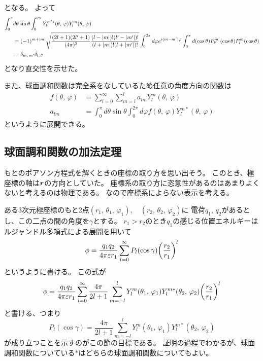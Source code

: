\documentclass[../master.tex]{subfiles}
\begin{document}
となる。
よって
\begin{equation}\begin{aligned}[b]
    \int_{0}^{\pi} &d\theta \sin\theta \int_{0}^{2\pi} Y_{l'}^{m'*}(\theta,\,\varphi) Y_l^m(\theta,\,\varphi)\\
	&= (-1)^{m+\abs{m}}\sqrt{\frac{(2l+1)(2l'+1)}{(4\pi)^2}\frac{(l-\abs{m})!(l'-\abs{m'})!}{(l+\abs{m})!(l+\abs{m'})!}}
	\int_{0}^{2\pi}d\varphi e^{i(m-m')\varphi} \int_{0}^{\pi} d(\cos\theta) P_{l'}^{m'}(\cos\theta)P_l^m(\cos\theta)\\
	&=\delta_{m,\,m'}\delta_{l,\,l'}
\end{aligned}\end{equation}
となり直交性を示せた。

また、球面調和関数は完全系をなしているため任意の角度方向の関数は
\begin{align}
	f(\theta,\,\varphi) &= \sum_{l=0}^{\infty}\sum_{m=l}^{l} a_{lm}Y_l^m(\theta,\,\varphi)\\
	a_{lm} &=\int_{0}^{\pi} d\theta\sin\theta\int_{0}^{2\pi}d\varphi f(\theta,\,\varphi)Y_l^{m*}(\theta,\,\varphi)
\end{align}
というように展開できる。

\subsection{球面調和関数の加法定理}
もとのポアソン方程式を解くときの座標の取り方を思い出そう。
このとき、極座標の軸は\(\vb*{r}\)の方向としていた。
座標系の取り方に恣意性があるのはあまりよくないと考えるのは物理である。
なので座標系によらない表示を考える。

ある3次元極座標のもと2点\((r_1,\,\theta_1,\,\varphi_1),\quad (r_2,\,\theta_2,\,\varphi_2)\)に
電荷\(q_1,\,q_2\)があるとし、この二点の間の角度を\(\gamma\)とする。
\(r_1>r_2\)のとき\(q_1\)の感じる位置エネルギーはルジャンドル多項式による展開を用いて
\begin{equation}
	\phi = \frac{q_1 q_2}{4\pi\varepsilon r_1} \sum_{l=0}^{\infty}P_l(\cos\gamma)\qty(\frac{r_2}{r_1})^l
\end{equation}
というように書ける。
この式が
\begin{equation}
	\phi = \frac{q_1 q_2}{4\pi\varepsilon r_1}
	\sum_{l=0}^{\infty}\frac{4\pi}{2l+1}\sum_{m=-l}^{l} Y_l^m(\theta_1,\,\varphi_1) Y_l^{m*}(\theta_2,\,\varphi_2)\qty(\frac{r_2}{r_1})^l
\end{equation}
と書ける、つまり
\begin{equation}
	P_l(\cos\gamma) = \frac{4\pi}{2l+1}\sum_{m=-l}^{l} Y_l^m(\theta_1,\,\varphi_1) Y_l^{m*}(\theta_2,\,\varphi_2)
\end{equation}
が成り立つことを示すのがこの節の目標である。
証明の過程でわかるが、球面調和関数についている\(*\)はどちらの球面調和関数についてもよい。
\end{document}

